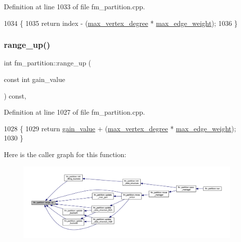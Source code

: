 Definition at line 1033 of file fm\+\_\+partition.\+cpp.


\begin{DoxyCode}
1034 \{
1035     \textcolor{keywordflow}{return} index - (\mbox{\hyperlink{classfm__partition_ab6a4beaa10548ce9f1a0e8e441492ef9}{max\_vertex\_degree}} * \mbox{\hyperlink{classfm__partition_a5b37b4ac8d96236f274a57a46d653e25}{max\_edge\_weight}});
1036 \}
\end{DoxyCode}
\mbox{\label{classfm__partition_ac49d477ecbf512fa375b76a472ec54f8}} 
\subsubsection{\texorpdfstring{range\+\_\+up()}{range\_up()}}
{\footnotesize\ttfamily int fm\+\_\+partition\+::range\+\_\+up (\begin{DoxyParamCaption}\item[{const int}]{gain\+\_\+value }\end{DoxyParamCaption}) const\hspace{0.3cm}{\ttfamily [inline]}, {\ttfamily [protected]}}



Definition at line 1027 of file fm\+\_\+partition.\+cpp.


\begin{DoxyCode}
1028 \{
1029     \textcolor{keywordflow}{return} \mbox{\hyperlink{classfm__partition_ae8176f4ce82305abfd58e519d2cdd91d}{gain\_value}} + (\mbox{\hyperlink{classfm__partition_ab6a4beaa10548ce9f1a0e8e441492ef9}{max\_vertex\_degree}} * 
      \mbox{\hyperlink{classfm__partition_a5b37b4ac8d96236f274a57a46d653e25}{max\_edge\_weight}});
1030 \}
\end{DoxyCode}
Here is the caller graph for this function\+:\nopagebreak
\begin{figure}[H]
\begin{center}
\leavevmode
\includegraphics[width=350pt]{classfm__partition_ac49d477ecbf512fa375b76a472ec54f8_icgraph}
\end{center}
\end{figure}
\mbox{\label{classfm__partition_a6db2eeb6ae968dbab78302f0448c0ced}} 
